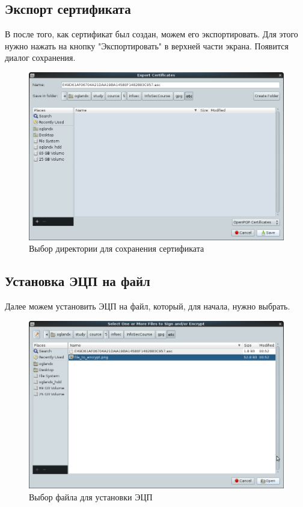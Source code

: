 \documentclass[a4paper]{article}
\begin{document}
\subsection{Экспорт сертификата}

В после того, как сертификат был создан, можем его экспортировать. Для этого нужно нажать на кнопку "Экспортировать" в верхней части экрана. Появится диалог сохранения.

\begin{figure}[H]
	\begin{center}
		\includegraphics[scale=0.5]{pics/Screenshot at 2016-04-18 00:52:52.png}
		\caption{Выбор директории для сохранения сертификата} 
		\label{pic:pic_name} %
	\end{center}
\end{figure}


\subsection{Установка ЭЦП на файл}


Далее можем установить ЭЦП на файл, который, для начала, нужно выбрать.

\begin{figure}[H]
	\begin{center}
		\includegraphics[scale=0.5]{pics/Screenshot at 2016-04-18 00:56:27.png}
		\caption{Выбор файла для установки ЭЦП} 
		\label{pic:pic_name} %
	\end{center}
\end{figure}
\end{document}
